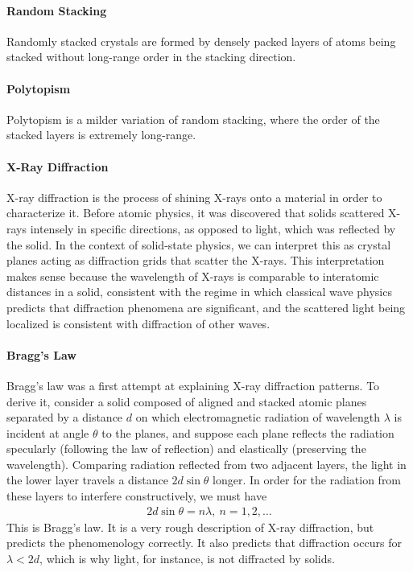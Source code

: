 \paragraph{Random Stacking}
Randomly stacked crystals are formed by densely packed layers of atoms being stacked without long-range order in the stacking direction.

\paragraph{Polytopism}
Polytopism is a milder variation of random stacking, where the order of the stacked layers is extremely long-range.


\paragraph{X-Ray Diffraction}
X-ray diffraction is the process of shining X-rays onto a material in order to characterize it. Before atomic physics, it was discovered that solids scattered X-rays intensely in specific directions, as opposed to light, which was reflected by the solid. In the context of solid-state physics, we can interpret this as crystal planes acting as diffraction grids that scatter the X-rays. This interpretation makes sense because the wavelength of X-rays is comparable to interatomic distances in a solid, consistent with the regime in which classical wave physics predicts that diffraction phenomena are significant, and the scattered light being localized is consistent with diffraction of other waves.

\paragraph{Bragg's Law}
Bragg's law was a first attempt at explaining X-ray diffraction patterns. To derive it, consider a solid composed of aligned and stacked atomic planes separated by a distance $d$ on which electromagnetic radiation of wavelength $\lambda$ is incident at angle $\theta$ to the planes, and suppose each plane reflects the radiation specularly (following the law of reflection) and elastically (preserving the wavelength). Comparing radiation reflected from two adjacent layers, the light in the lower layer travels a distance $2d\sin{\theta}$ longer. In order for the radiation from these layers to interfere constructively, we must have
\begin{align*}
	2d\sin{\theta} = n\lambda,\ n = 1, 2, \dots
\end{align*}
This is Bragg's law. It is a very rough description of X-ray diffraction, but predicts the phenomenology correctly. It also predicts that diffraction occurs for $\lambda < 2d$, which is why light, for instance, is not diffracted by solids.

